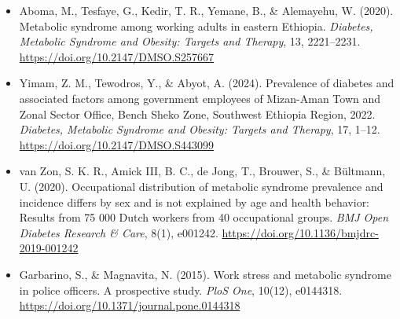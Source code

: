 \begin{itemize}
    \item Aboma, M., Tesfaye, G., Kedir, T. R., Yemane, B., \& Alemayehu, W. (2020). Metabolic syndrome among working adults in eastern Ethiopia. \textit{Diabetes, Metabolic Syndrome and Obesity: Targets and Therapy}, 13, 2221–2231. \url{https://doi.org/10.2147/DMSO.S257667}

    \item Yimam, Z. M., Tewodros, Y., \& Abyot, A. (2024). Prevalence of diabetes and associated factors among government employees of Mizan-Aman Town and Zonal Sector Office, Bench Sheko Zone, Southwest Ethiopia Region, 2022. \textit{Diabetes, Metabolic Syndrome and Obesity: Targets and Therapy}, 17, 1–12. \url{https://doi.org/10.2147/DMSO.S443099}

    \item van Zon, S. K. R., Amick III, B. C., de Jong, T., Brouwer, S., \& Bültmann, U. (2020). Occupational distribution of metabolic syndrome prevalence and incidence differs by sex and is not explained by age and health behavior: Results from 75 000 Dutch workers from 40 occupational groups. \textit{BMJ Open Diabetes Research \& Care}, 8(1), e001242. \url{https://doi.org/10.1136/bmjdrc-2019-001242}

    \item Garbarino, S., \& Magnavita, N. (2015). Work stress and metabolic syndrome in police officers. A prospective study. \textit{PloS One}, 10(12), e0144318. \url{https://doi.org/10.1371/journal.pone.0144318}
\end{itemize}

